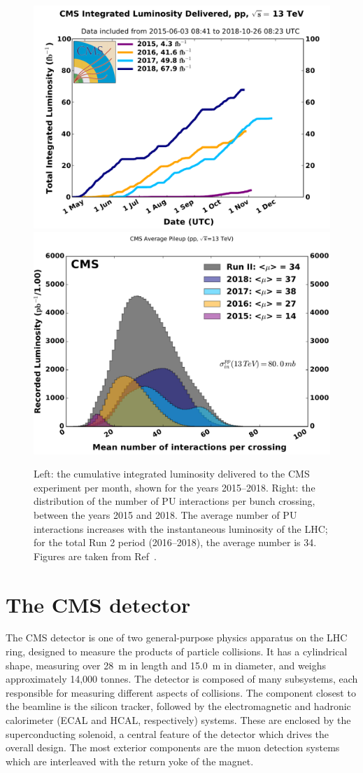 \begin{figure}[htbp!]
\centering
\includegraphics[trim={0cm 0cm 0cm 1.96cm}, clip, width=0.49\linewidth]{Figures/Detector/LHC/int_lumi_cumulative_pp_2_run2.pdf}\hfill%
\includegraphics[trim={0cm -0.3cm 0cm 1.5cm}, clip, width=0.46\linewidth]{Figures/Detector/LHC/pileup_allYears_run2.pdf}\hfill%
\caption[The integrated luminosity delivered to CMS, and the average number of PU interactions per bunch crossing.]{Left: the cumulative integrated luminosity delivered to the CMS experiment per month, shown for the years 2015--2018. Right: the distribution of the number of PU interactions per bunch crossing, between the years 2015 and 2018. The average number of PU interactions increases with the instantaneous luminosity of the LHC; for the total Run 2 period (2016--2018), the average number is 34. Figures are taken from Ref~\cite{CMSLumiPublic}.}
\label{fig:detector_lumi_pileup}
\end{figure}




\section{The CMS detector}

The CMS detector is one of two general-purpose physics apparatus on the LHC ring, designed to measure the products of particle collisions. It has a cylindrical shape, measuring over 28~m in length and 15.0~m in diameter, and weighs approximately 14,000 tonnes. The detector is composed of many subsystems, each responsible for measuring different aspects of collisions. The component closest to the beamline is the silicon tracker, followed by the electromagnetic and hadronic calorimeter (ECAL and HCAL, respectively) systems. These are enclosed by the superconducting solenoid, a central feature of the detector which drives the overall design. The most exterior components are the muon detection systems which are interleaved with the return yoke of the magnet.

